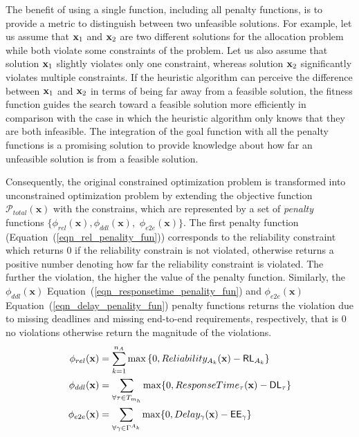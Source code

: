 The benefit of using a single function, including all penalty functions, is to provide a metric to distinguish between two unfeasible solutions. For example, let us assume that $\textbf{x}_1$ and $\textbf{x}_2$ are two different solutions for the allocation problem while both violate
some constraints of the problem. Let us also assume that solution
$\textbf{x}_1$ slightly violates only one constraint, whereas solution
$\textbf{x}_2$ significantly violates multiple constraints. If the heuristic algorithm can perceive the difference between $\textbf{x}_1$ and $\textbf{x}_2$
in terms of being far away from a feasible solution, the fitness function guides the search toward a feasible solution more efficiently in comparison with the case in which the heuristic algorithm only knows that they are both infeasible. The integration of the goal function with all
the penalty functions is a promising solution to provide knowledge about how far an unfeasible solution is from a feasible
solution. 

Consequently, the original constrained optimization problem is transformed into unconstrained optimization problem by extending the objective function $\mathcal{P}_{total}(\textbf{x})$ with the constrains, which are represented by a set of \textit{penalty} functions $\{\phi_{rel}(\textbf{x}),\phi_{ddl}(\textbf{x}),$ $\phi_{e2e}(\textbf{x})\}$. The first penalty function (Equation~(\ref{eqn_rel_penality_fun})) corresponds to the reliability constraint which returns 0 if the reliability constrain is not violated, otherwise returns a positive number denoting how far the reliability constraint is violated. The further the violation, the higher the value of the penalty function. Similarly, the $\phi_{ddl}(\textbf{x})$ Equation~(\ref{eqn_responsetime_penality_fun}) and $\phi_{e2e}(\textbf{x})$ Equation~(\ref{eqn_delay_penality_fun}) penalty functions returns the violation due to missing deadlines and missing end-to-end requirements, respectively, that is 0 no violations otherwise return the magnitude of the violations. 
\begin{align}
\label{eqn_rel_penality_fun}
\phi_{rel}(\textbf{x}) &= \sum_{k=1}^{n_{A}}{\max {\{0, \rel_{A_k}(\x) - \RL_{A_k} \}}}\\
\label{eqn_responsetime_penality_fun}
\phi_{ddl}(\textbf{x}) &= \sum_{\forall \tau\in T_{m_h}}{\max \{0, ResponseTime_{\tau}(\x) - \DL_{\tau} \}}\\
\label{eqn_delay_penality_fun}
\phi_{e2e}(\textbf{x}) &= \sum_{\forall \gamma \in \ssp{\Gamma}}{\max \{0, Delay_\gamma(\x) - \EE_\gamma \}}
\end{align}

